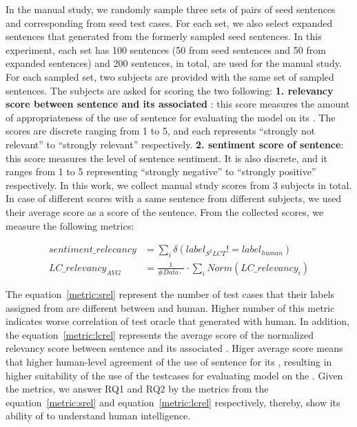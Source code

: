 In the manual study, we randomly sample three sets of pairs of seed
sentences and corresponding \lc from seed test cases. For each set, we
also select expanded sentences that \tool generated from the formerly
sampled seed sentences. In this experiment, each set has 100 sentences
(50 from seed sentences and 50 from expanded sentences) and 200
sentences, in total, are used for the manual study. For each sampled
set, two subjects are provided with the same set of sampled
sentences. The subjects are asked for scoring the two following:
\textbf{1. relevancy score between sentence and its associated \lc}:
this score measures the amount of appropriateness of the use of
sentence for evaluating the model on its \lc.  The scores are discrete
ranging from 1 to 5, and each represents ``strongly not relevant'' to
``strongly relevant'' respectively. \textbf{2. sentiment score of
  sentence}: this score measures the level of sentence sentiment. It
is also discrete, and it ranges from 1 to 5 representing ``strongly
negative'' to ``strongly positive'' respectively. In this work, we
collect manual study scores from 3 subjects in total. In case of
different scores with a same sentence from different subjects, we used
their average score as a score of the sentence.
From the collected scores, we measure the following metrics:

\begin{eqnarray}
  sentiment\_relecancy &= \sum_{i} \delta(label_{S^2LCT}!=label_{human}) \label{metric:srel} \\
  LC\_relevancy_{AVG} &= \frac{1}{\#Data\cdot~}\cdot\sum_{i} Norm(LC\_relevancy_i) \label{metric:lcrel}
\end{eqnarray}

The equation~\ref{metric:srel} represent the number of test cases that
their labels assigned from are different between \tool and
human. Higher number of this metric indicates worse correlation of
test oracle that \tool generated with human. In addition, the
equation~\ref{metric:lcrel} represents the average score of the
normalized relevancy score between sentence and its associated
\lc. Higer average score means that higher human-level agreement of
the use of sentence for its \lc, resulting in higher suitability of
the use of the testcases for evaluating model on the \lc. Given the
metrics, we answer RQ1 and RQ2 by the metrics from the
equation~\ref{metric:srel} and equation~\ref{metric:lcrel}
respectively, thereby, show its ability of \tool to understand human
intelligence.

